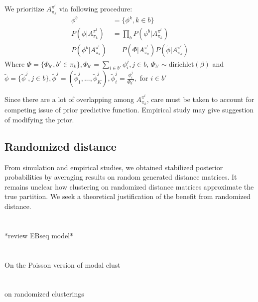 \documentclass[11pt]{amsart}
\begin{document}
We prioritize $A_{\pi_k}^{\pi^l}$ via following procedure:
\begin{align}
\phi^b &= \{\phi^k, k \in b\}\\
P(\phi | A_{\pi_k}^{\pi^l}) &= \underset{b}\prod P(\phi^b | A_{\pi_k}^{\pi^l})\\
P(\phi^b | A_{\pi_k}^{\pi^l}) &= P(\Phi | A_{\pi_k}^{\pi^l}) P(\tilde{\phi} |A_{\pi_k}^{\pi^l})
\end{align}
Where $\Phi = \{\Phi_{b'}, b' \in \pi_k\},  \Phi_{b'} = \underset{i\in b'}\sum\phi_i^j, j\in b$,  $\Phi_{b'} \sim \text{dirichlet}(\beta)$ and $\tilde{\phi} = \{\tilde{\phi}^j, j \in b\},
\tilde{\phi}^j = (\tilde{\phi}_1^j, ... , \tilde{\phi}_K^j), \tilde{\phi}_i^j = \frac{\phi_i^j}{\Phi_b'},$ for $ i \in b'$

Since there are a lot of overlapping among $A_{\pi_k}^{\pi^l}$, care must be taken to account for competing issue of prior predictive function. Empirical study may give suggestion of modifying the prior.

\subsection{Randomized distance}
From simulation and empirical studies, we obtained stabilized posterior probabilities by averaging results on random generated distance matrices. It remains unclear how clustering on randomized distance matrices approximate the true partition. We seek a theoretical justification of the benefit from randomized distance. 




\newpage

\appendix
\section{}

*review EBseq model*

\section{}

On the Poisson version of modal clust

\section{}

on randomized clusterings
\end{document}
